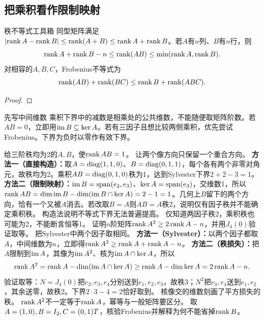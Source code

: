 \subsection{把乘积看作限制映射}
\begin{theorem}{秩不等式工具箱}
同型矩阵满足$\left|\operatorname{rank} A-\operatorname{rank} B\right|\le\operatorname{rank}(A+B)\le\operatorname{rank} A+\operatorname{rank} B$。若$A$有$n$列、$B$有$n$行，则
\begin{equation}\operatorname{rank} A+\operatorname{rank} B-n\le\operatorname{rank}(AB)\le\min(\operatorname{rank} A,\operatorname{rank} B).\label{eq:sylvester}\end{equation}
对相容的$A,B,C$，Frobenius不等式为
\begin{equation}\operatorname{rank}(AB)+\operatorname{rank}(BC)\le\operatorname{rank} B+\operatorname{rank}(ABC).\label{eq:frobenius}\end{equation}
\end{theorem}
\begin{proof}

\end{proof}
\begin{method}{先写中间维数}
乘积下界中的减数是相乘处的公共维数，不能随便取矩阵阶数。若$AB=0$，立即用$\operatorname{im} B\subseteq\ker A$。若有三因子且想比较两侧乘积，优先尝试Frobenius。下界为负时以零作有效下界。
\end{method}
{给三阶秩均为2的$A,B$，使$\operatorname{rank} AB=1$。}
{让两个像方向只保留一个重合方向。}
{\textbf{方法一（直接构造）：}取$A=\operatorname{diag}(1,1,0)$、$B=\operatorname{diag}(0,1,1)$，每个各有两个非零对角元，故秩均为2。乘积$AB=\operatorname{diag}(0,1,0)$秩为1，达到Sylvester下界$2+2-3=1$。
\textbf{方法二（限制映射）：}$\operatorname{im} B=\operatorname{span}(e_2,e_3)$、$\ker A=\operatorname{span}(e_3)$，交维数1，所以$\operatorname{rank} AB=\dim\operatorname{im} B-\dim(\operatorname{im} B\cap\ker A)=2-1=1$。几何上$B$留下的两个方向，恰有一个又被$A$消去。若改取$B=A$则$AB=A$秩2，说明仅有因子秩并不能确定乘积秩。}
{构造法说明不等式下界无法普遍提高。}
{仅知道两因子秩2，乘积秩也可能为2，不能断言恒等1。}
{证明$n$阶矩阵$\operatorname{rank} A^2\ge2\operatorname{rank} A-n$，并用$J_4(0)$验证取等。}
{把Sylvester中两个因子取相同。}
{\textbf{方法一（Sylvester）：}以两个因子都取$A$，中间维数为$n$，立即得$\operatorname{rank} A^2\ge\operatorname{rank} A+\operatorname{rank} A-n$。
\textbf{方法二（秩损失）：}把$A$限制到$\operatorname{im} A$，其像为$\operatorname{im} A^2$、核为$\operatorname{im} A\cap\ker A$，所以
\[\operatorname{rank} A^2=\operatorname{rank} A-\dim(\operatorname{im} A\cap\ker A)
\ge\operatorname{rank} A-\dim\ker A=2\operatorname{rank} A-n.\]
验证取等：$N=J_4(0)$把$e_2,e_3,e_4$分别送到$e_1,e_2,e_3$，故秩3；$N^2$把$e_3,e_4$送到$e_1,e_2$，其余送零，故秩2。下界$2\cdot3-4=2$恰好取到。}
{核像交的维数刻画了平方损失的秩。}
{$\operatorname{rank} A^2$不一定等于$\operatorname{rank} A$，幂等与一般矩阵要区分。}
{取$A=(1,0),B=I_2,C=(0,1)T$，核验Frobenius并解释为何不能省掉$\operatorname{rank} B$。}

